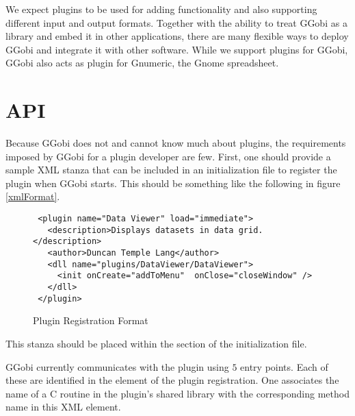 \documentclass{article}
\begin{document}
We expect plugins to be used for adding functionality and also
supporting different input and output formats.  Together with the
ability to treat GGobi as a library and embed it in other
applications, there are many flexible ways to deploy GGobi and
integrate it with other software.  While we support plugins for GGobi,
GGobi also acts as plugin for Gnumeric, the Gnome spreadsheet.


\begin{comment}
\section{Hooks and Events}
Allow the plugin to write to the stored data
in the ggobirc.  
\end{comment}

\section{API}
Because GGobi does not and cannot know much about plugins, the
requirements imposed by GGobi for a plugin developer are few.
First, one should provide a sample XML stanza that can be included in
an initialization file to register the plugin when GGobi starts.  This
should be something like the following in figure \ref{xmlFormat}.

\begin{figure}[htbp]
  \begin{center}
    \leavevmode
\begin{verbatim}
 <plugin name="Data Viewer" load="immediate">
   <description>Displays datasets in data grid.</description>
   <author>Duncan Temple Lang</author>
   <dll name="plugins/DataViewer/DataViewer">
     <init onCreate="addToMenu"  onClose="closeWindow" />
   </dll>
 </plugin>    
\end{verbatim}
    \caption{Plugin Registration Format}
    \label{fig:xmlRegistration}
  \end{center}
\end{figure}

This stanza should be placed within the 
section of the initialization file.

GGobi currently communicates with the plugin using $5$ entry points.
Each of these are identified in the  element of the
plugin registration.  One associates the name of a C routine in the
plugin's shared library with the corresponding method name in this XML
element.
 
\end{document}
